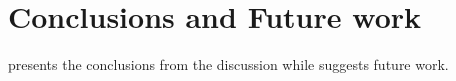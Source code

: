 \chapter{Conclusions and Future work}
\label{ch:conclusionsAndFutureWork}
 presents the conclusions from the discussion  while  suggests future work.





% 



% 